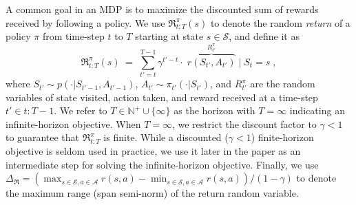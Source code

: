 \documentclass[twoside]{article}
\newcommand{\states}{\mathcal{S}}
\newcommand{\actions}{\mathcal{A}}
\newcommand{\vspan}{\Delta_{\mathfrak{R}}}
\theoremstyle{plain}
\theoremstyle{definition}
\theoremstyle{remark}
\begin{document}
A common goal in an MDP is to maximize the discounted sum of rewards received by following a policy. We use $\mathfrak{R}_{t{:}T}^\pi(s)$ to denote the random \emph{return} of a policy $\pi$ from time-step $t$ to $T$ starting at state $s\in \states$, and define it as
%
\begin{equation} \label{ent:eq:return}
    \mathfrak{R}_{t{:}T}^\pi(s) \;=\; \sum_{t'=t}^{T-1} \gamma^{t'-t} \cdot \;\overbrace{r(S_{t'},A_{t'})}^{R_{t'}^\pi} \mid S_t = s \; , %
\end{equation}
%
where $S_{t'}\sim p(\cdot|S_{t'-1},A_{t'-1})$, $A_{t'} \sim \pi_{t'}(\cdot|S_{t'})$, and $R_{t'}^{\pi}$ are the random variables of state visited, action taken, and reward received at a time-step $t'\in t{:}T{-}1$. We refer to $T \in \mathbb{N}^+ \cup \{\infty\}$ as the horizon with $T = \infty$ indicating an infinite-horizon objective. When $T = \infty$, we restrict the discount factor to $\gamma  < 1$ to guarantee that $\mathfrak{R}_{t{:}T}^\pi$ is finite. While a discounted ($\gamma < 1$) finite-horizon objective is seldom used in practice, we use it later in the paper as an intermediate step for solving the infinite-horizon objective. Finally, we use $\vspan = (\max_{s\in \states,a\in \actions} r(s,a) - \min_{s\in \states,a\in \actions}r(s,a))/(1-\gamma)$ to denote the maximum range (span semi-norm) of the return random variable. 
\end{document}
